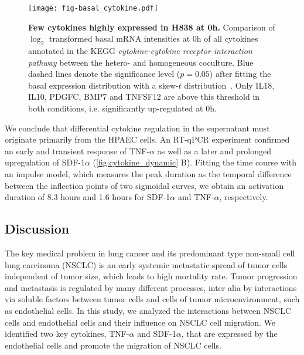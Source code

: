 \begin{figure}[!ht]
\begin{center}
\texttt{[image: fig-basal\_cytokine.pdf]}
\end{center}
\caption[Basal cytokine gene expression]{
{\bf Few cytokines highly expressed in H838 at 0h.}
Comparison of $\log_2$ transformed basal mRNA intensities at 0h of all 
cytokines annotated 
in the KEGG \emph{cytokine-cytokine receptor interaction pathway} between
the hetero- and homogeneous coculture. Blue dashed lines denote the significance
level ($p=0.05$) after fitting the basal expression distribution with a skew-$t$ 
distribution~\cite{Azzalini2003}. Only IL18, IL10, PDGFC,
BMP7 and TNFSF12 are above this threshold in both conditions, 
i.e. significantly up-regulated
at 0h.
}
\label{fig:cytokine_basal}
\end{figure}

We conclude that differential cytokine regulation in the supernatant 
must originate primarily from the HPAEC cells.  
An RT-qPCR experiment confirmed an early and transient response of  
TNF-$\alpha$ as well as a later and prolonged upregulation of 
SDF-1$\alpha$ (\ref{fig:cytokine_dynamic} B). 
Fitting the time course with an impulse model, which measures the peak 
duration as the 
temporal difference between the inflection points of two
sigmoidal curves, 
we obtain an activation duration of  8.3 hours and 1.6 hours for SDF-1$\alpha$
and TNF-$\alpha$, respectively.

\subsection{Discussion}

The key medical problem in lung cancer and its predominant type non-small 
cell lung carcinoma (NSCLC) is an early systemic metastatic spread of tumor cells 
independent of tumor size, which leads to high mortality rate. Tumor progression 
and metastasis is regulated by many different processes, inter alia by interactions 
via soluble factors between tumor cells and cells of tumor microenvironment, such as 
endothelial cells. In this study, we analyzed the interactions between NSCLC cells 
and endothelial cells and their influence on NSCLC cell migration. We identified 
two key cytokines, TNF-$\alpha$ and SDF-1$\alpha$, that are expressed by the 
endothelial cells and promote the migration of NSCLC cells.

